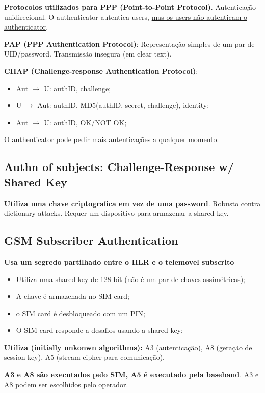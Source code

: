 \documentclass{article}
\begin{document}
\begin{flushleft}
  \textbf{Protocolos utilizados para PPP (Point-to-Point Protocol)}.
  Autenticação unidirecional. O authenticator autentica users, \uline{mas
  os users não autenticam o authenticator}.

  \vspace{2mm}

  \textbf{PAP (PPP Authentication Protocol)}: Representação simples de um par de UID/password.
  Transmissão insegura (em clear text).

  \vspace{2mm}

  \textbf{CHAP (Challenge-response Authentication Protocol)}:
  \begin{itemize}
    \item Aut $\rightarrow$ U: authID, challenge;
    \item U $\rightarrow$ Aut: authID, MD5(authID, secret, challenge), identity;
    \item Aut $\rightarrow$ U: authID, OK/NOT OK;
  \end{itemize}

  O authenticator pode pedir mais autenticações a qualquer momento.
\end{flushleft}

\subsection{Authn of subjects: Challenge-Response w/ Shared Key}

\begin{flushleft}
  \textbf{Utiliza uma chave criptografica em vez de uma password}.
  Robusto contra dictionary attacks. Requer um dispositivo para
  armazenar a shared key.
\end{flushleft}

\subsection{GSM Subscriber Authentication}

\begin{flushleft}
  \textbf{Usa um segredo partilhado entre o HLR e o telemovel subscrito}
  \begin{itemize}
    \item Utiliza uma shared key de 128-bit (não é um par de chaves assimétricas);
    \item A chave é armazenada no SIM card;
    \item o SIM card é desbloqueado com um PIN;
    \item O SIM card responde a desafios usando a shared key;
  \end{itemize}

  \textbf{Utiliza (initially unkonwn algorithms):} A3 (autenticação),
  A8 (geração de session key), A5 (stream cipher para comunicação).

  \vspace{2mm}

  \textbf{A3 e A8 são executados pelo SIM, A5 é executado pela baseband}.
  A3 e A8 podem ser escolhidos pelo operador.
\end{flushleft}
\end{document}
